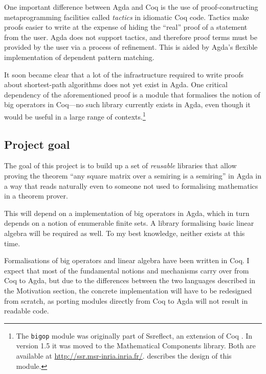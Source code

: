 \documentclass[a4paper]{scrartcl}
\begin{document}
One important difference between Agda and Coq is the use of proof-constructing metaprogramming facilities called \emph{tactics} in idiomatic Coq code.
Tactics make proofs easier to write at the expense of hiding the \enquote{real} proof of a statement from the user.
Agda does not support tactics, and therefore proof terms must be provided by the user via a process of refinement. This is aided by Agda's flexible implementation of dependent pattern matching.

It soon became clear that a lot of the infrastructure required to write proofs about shortest-path algorithms does not yet exist in Agda.
One critical dependency of the aforementioned proof is a module that formalises the notion of big operators in Coq---no such library currently exists in Agda, even though it would be useful in a large range of contexts.\footnote{The \texttt{bigop} module was originally part of Ssreflect, an extension of Coq \autocite{gonthier_introduction_2010}. In version 1.5 it was moved to the Mathematical Components library. Both are available at \url{http://ssr.msr-inria.inria.fr/}. \textcite{bertot_canonical_2008} describes the design of this module.}

\subsection{Project goal}

The goal of this project is to build up a set of \emph{reusable} libraries that allow proving the theorem \enquote{any square matrix over a semiring is a semiring} in Agda in a way that reads naturally even to someone not used to formalising mathematics in a theorem prover.

This will depend on a implementation of big operators in Agda, which in turn depends on a notion of enumerable finite sets. A library formalising basic linear algebra will be required as well. To my best knowledge, neither exists at this time.

Formalisations of big operators and linear algebra have been written in Coq.
I expect that most of the fundamental notions and mechanisms carry over from Coq to Agda, but due to the differences between the two languages described in the Motivation section, the concrete implementation will have to be redesigned from scratch, as porting modules directly from Coq to Agda will not result in readable code.
\end{document}
